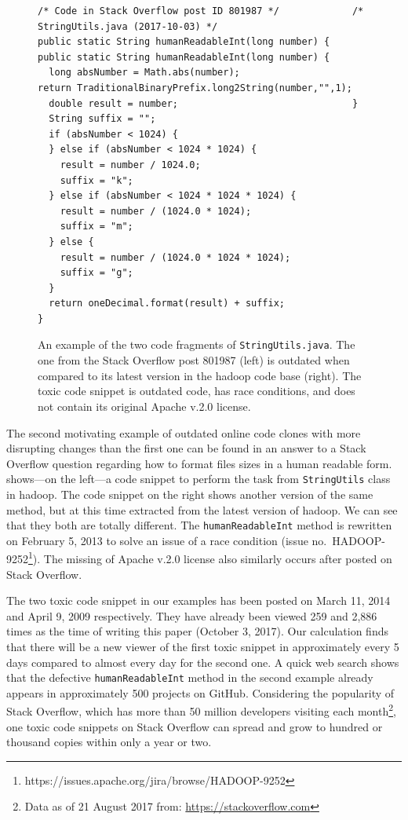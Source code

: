 \documentclass[10pt,journal,compsoc]{IEEEtran}
\begin{document}
\begin{figure}
	\begin{lstlisting}
/* Code in Stack Overflow post ID 801987 */             /* StringUtils.java (2017-10-03) */
public static String humanReadableInt(long number) {    public static String humanReadableInt(long number) {
  long absNumber = Math.abs(number);                      return TraditionalBinaryPrefix.long2String(number,"",1);
  double result = number;                               }
  String suffix = "";
  if (absNumber < 1024) {
  } else if (absNumber < 1024 * 1024) {
    result = number / 1024.0;
    suffix = "k";
  } else if (absNumber < 1024 * 1024 * 1024) {
    result = number / (1024.0 * 1024);
    suffix = "m";
  } else {
    result = number / (1024.0 * 1024 * 1024);
    suffix = "g";
  }
  return oneDecimal.format(result) + suffix;
}
	\end{lstlisting}\vspace{-2ex}
	\caption{An example of the two code fragments of
		{\small\texttt{StringUtils.java}}. The one from the
		Stack Overflow post 801987 (left) is outdated when compared to
		its latest version in the \textsf{hadoop} code base
		(right). The toxic code snippet is outdated code, has race conditions, and does not contain its
		original Apache v.2.0 license.}
	\label{fig:before-after_2}
\end{figure}

The second motivating example of outdated online code clones with more
disrupting changes than the first one  can be found in an answer to a Stack
Overflow question regarding how to format files sizes in a human readable form.
 shows---on the left---a code snippet to perform the
task from {\small{\texttt{StringUtils}}} class in \textsf{hadoop}. The code snippet on the
right shows another version of the same method, but at this time extracted from
the latest version of \textsf{hadoop}. We can see that
they both are totally different. The {\small{\texttt{humanReadableInt}}} method is
rewritten on February 5, 2013 to solve an issue of a race condition
(issue no.~HADOOP-9252\footnote{https://issues.apache.org/jira/browse/HADOOP-9252}).
The missing of Apache v.2.0 license also similarly occurs after posted on 
Stack Overflow.

The two toxic code snippet in our examples has been posted on March 11, 2014 and
April 9, 2009 respectively. They have already been viewed 259 and 2,886 times as
the time of writing this paper (October 3, 2017). Our calculation finds that
there will be a new viewer of the first toxic snippet in approximately every 5
days compared to almost every day for the second one. A quick web search shows
that the defective {\small{\texttt{humanReadableInt}}} method in the second
example already appears in approximately 500 projects on GitHub. Considering the
popularity of Stack Overflow, which has more than 50 million developers visiting
each month\footnote{Data as of 21 August 2017 from:
	\url{https://stackoverflow.com}}, one toxic code snippets on Stack Overflow can
spread and grow to hundred or thousand copies within only a year or two.
\end{document}
